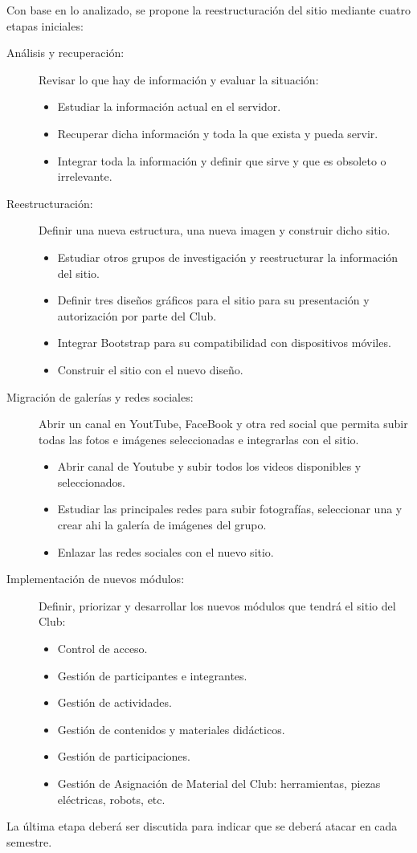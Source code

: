 	Con base en lo analizado, se propone la reestructuración del sitio mediante cuatro etapas iniciales:
	
\begin{description}
	\item[Análisis y recuperación:] Revisar lo que hay de información y evaluar la situación:	
	\begin{itemize}
 		\item Estudiar la información actual en el servidor.
		\item Recuperar dicha información y toda la que exista y pueda servir.
		\item Integrar toda la información y definir que sirve y que es obsoleto o irrelevante.
	\end{itemize}
	\item[Reestructuración:] Definir una nueva estructura, una nueva imagen y construir dicho sitio.	
    \begin{itemize}
    	\item Estudiar otros grupos de investigación y reestructurar la información del sitio.
		\item Definir tres diseños gráficos para el sitio para su presentación y autorización por parte del Club.
		\item Integrar Bootstrap para su compatibilidad con dispositivos móviles.
		\item Construir el sitio con el nuevo diseño.
    \end{itemize}
	\item[Migración de galerías y redes sociales:] Abrir un canal en YoutTube, FaceBook y otra red social que permita subir todas las fotos e imágenes seleccionadas e integrarlas con el sitio.	
    \begin{itemize}
    	\item Abrir canal de Youtube y subir todos los videos disponibles y seleccionados.
		\item Estudiar las principales redes para subir fotografías, seleccionar una y crear ahi la galería de imágenes del grupo.
		\item Enlazar las redes sociales con el nuevo sitio.
    \end{itemize}
	\item[Implementación de nuevos módulos:] Definir, priorizar y desarrollar los nuevos módulos que tendrá el sitio del Club:	
    \begin{itemize}
		\item Control de acceso.
		\item Gestión de participantes e integrantes.
		\item Gestión de actividades.
		\item Gestión de contenidos y materiales didácticos.
		\item Gestión de participaciones.
		\item Gestión de Asignación de Material del Club: herramientas, piezas eléctricas, robots, etc.
    \end{itemize}
\end{description}

	La última etapa deberá ser discutida para indicar que se deberá atacar en cada semestre.